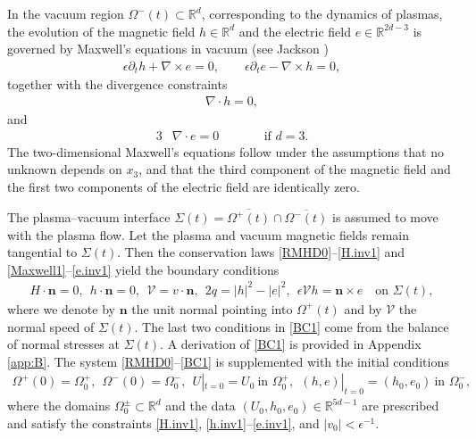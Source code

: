 \documentclass[twoside,11pt]{article}
\numberwithin{equation}{section}
\def\p{\partial}
\begin{document}
In the vacuum region $\Omega^-(t)\subset\mathbb{R}^d$, corresponding to the dynamics of plasmas,
the evolution of the magnetic field $h\in \mathbb{R}^d$ and the electric field $e\in \mathbb{R}^{2d-3}$ is governed by Maxwell's equations in vacuum (see {\sc Jackson} \cite[\S 1.1]{J75MR0436782})
	\begin{align} \label{Maxwell1}
 \epsilon \p_t h+\nabla\times e=0,\qquad
 \epsilon \p_t e-\nabla\times h=0,
	\end{align}
together with  the divergence constraints
\begin{align}
	\label{h.inv1}
	\nabla\cdot h=0,
\end{align}	
and
\begin{alignat}{3}
	\label{e.inv1}
	&\nabla\cdot e=0\qquad &&\textrm{if }d=3.
\end{alignat}	
The two-dimensional Maxwell's equations follow under the assumptions that no unknown depends on $x_3$, and that the third component of the magnetic field and the first two components of the electric field are identically zero. %


The plasma--vacuum interface $\Sigma(t)=\overline{\Omega^+(t)}\cap \overline{\Omega^-(t)}
$ is assumed to move with the plasma flow. Let the plasma and vacuum magnetic fields remain tangential to $\Sigma(t)$. Then the conservation laws \eqref{RMHD0}--\eqref{H.inv1} and \eqref{Maxwell1}--\eqref{e.inv1}  yield the boundary conditions
	\begin{gather}
			\label{BC1}
	H\cdot \bm{n}=0,\ \   h\cdot \bm{n}=0, \ \
				\mathcal{V}=v\cdot \bm{n},\ \
 2q=  |h|^2-|e|^2,\ \
 \epsilon \mathcal{V} h=\bm{n}\times e
 \quad \textrm{on }\Sigma(t),
		\end{gather}	
where we denote by $\bm{n}$ the unit normal pointing into $\Omega^+(t)$ and by $\mathcal{V}$ the normal speed of $\Sigma(t)$. 		
The last two conditions in \eqref{BC1} come from the balance of normal stresses at $\Sigma(t)$. A derivation of \eqref{BC1} is provided in Appendix \ref{app:B}. The system \eqref{RMHD0}--\eqref{BC1} is supplemented with the initial conditions
\begin{align} \label{IC0}
	\Omega^+(0)=\Omega_0^+,\ \
		\Omega^-(0)=\Omega_0^-,\ \
	U|_{t=0}=U_0\   \textrm{in }\Omega_0^+,\ \
	(h,e)|_{t=0}=(h_0,e_0)\   \textrm{in }\Omega_0^-,
\end{align}
where the domains $\Omega_0^{\pm}\subset \mathbb{R}^d$ and the data $(U_0,h_0,e_0)\in \mathbb{R}^{5d-1}$ are prescribed and satisfy the constraints \eqref{H.inv1}, \eqref{h.inv1}--\eqref{e.inv1}, and $|v_0|<\epsilon^{-1}$.
\end{document}
